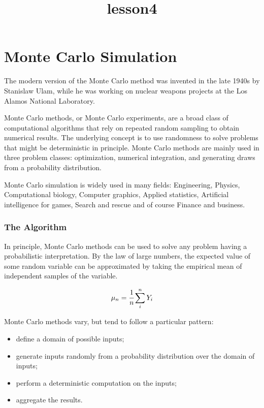 \documentclass[11pt]{article}
\title{lesson4}
\providecommand{\tightlist}{%
      \setlength{\itemsep}{0pt}\setlength{\parskip}{0pt}}
\begin{document}
    
    \maketitle
    
    

    
    \hypertarget{monte-carlo-simulation}{%
\section{Monte Carlo Simulation}\label{monte-carlo-simulation}}

The modern version of the Monte Carlo method was invented in the late
1940s by Stanislaw Ulam, while he was working on nuclear weapons
projects at the Los Alamos National Laboratory.

Monte Carlo methods, or Monte Carlo experiments, are a broad class of
computational algorithms that rely on repeated random sampling to obtain
numerical results. The underlying concept is to use randomness to solve
problems that might be deterministic in principle. Monte Carlo methods
are mainly used in three problem classes: optimization, numerical
integration, and generating draws from a probability distribution.

Monte Carlo simulation is widely used in many fields: Engineering,
Physics, Computational biology, Computer graphics, Applied statistics,
Artificial intelligence for games, Search and rescue and of course
Finance and business.

\hypertarget{the-algorithm}{%
\subsubsection{The Algorithm}\label{the-algorithm}}

In principle, Monte Carlo methods can be used to solve any problem
having a probabilistic interpretation. By the law of large numbers, the
expected value of some random variable can be approximated by taking the
empirical mean of independent samples of the variable.

\[ \mu_n = \cfrac{1}{n}\sum_i^n Y_i \]

Monte Carlo methods vary, but tend to follow a particular pattern:

\begin{itemize}
\tightlist
\item
  define a domain of possible inputs;
\item
  generate inputs randomly from a probability distribution over the
  domain of inputs;
\item
  perform a deterministic computation on the inputs;
\item
  aggregate the results.
\end{itemize}
\end{document}
